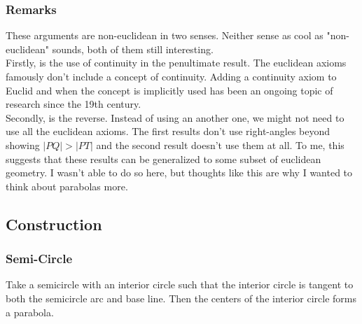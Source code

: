 \subsubsection{Remarks}
These arguments are non-euclidean in two senses.
Neither sense as cool as "non-euclidean" sounds,
both of them still interesting.
\\

Firstly, is the use of continuity in the penultimate result.
The euclidean axioms famously don't include a concept of continuity.
Adding a continuity axiom to Euclid and when the concept is implicitly used has been an ongoing topic of research since the 19th century.
\\

Secondly, is the reverse.
Instead of using an another one,
we might not need to use all the euclidean axioms.
The first results don't use right-angles beyond showing $|PQ| > |PT|$ and the second result doesn't use them at all.
To me, this suggests that these results can be generalized to some subset of euclidean geometry.
I wasn't able to do so here,
but thoughts like this are why I wanted to think about parabolas more.

\subsection{Construction}
\subsubsection{Semi-Circle}
\begin{center}
\end{center}
Take a semicircle with an interior circle such that the interior circle is tangent to both the semicircle arc and base line.
Then the centers of the interior circle forms a parabola.
\\

